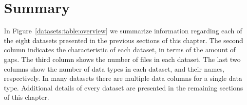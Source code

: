 
\clearpage
\section{Summary}
\label{datasets:summary}


In Figure~\ref{datasets:table:overview} we summarize information regarding each of the eight datasets presented in the previous sections of this chapter. The second column indicates the characteristic of each dataset, in terms of the amount of gaps. The third column shows the number of files in each dataset. The last two columns show the number of data types in each dataset, and their names, respectively. In many datasets there are multiple data columns for a single data type. Additional details of every dataset are presented in the remaining sections of this chapter.




